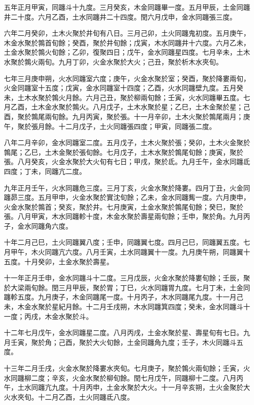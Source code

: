 \begin{pinyinscope}
五年正月甲寅，同躔斗十九度。三月癸亥，木金同躔畢一度。五月甲辰，土金同躔井二十度。六月乙酉，土水同躔井二十四度。閏六月戊申，金水同躔張三度。

六年二月癸卯，土木火聚於井旬有八日。三月己卯，土火同躔鬼初度。五月庚午，木金水聚於鶉首旬餘；癸酉，聚於井旬餘；戊寅，木水同躔井十六度。六月乙未，土金水聚於鶉火旬餘；乙卯，復聚四日；戊午，金水同躔星四度。七月辛未，土木水聚於鶉火兩旬。九月丁卯，火金水聚於大火；己丑，聚於析木水夾旬。

七年三月庚申朔，火水同躔室六度；庚午，火金水聚於室；癸酉，聚於降婁兩旬，火金同躔室十五度；戊寅，金水同躔室十四度；乙酉，火水同躔壁九度。五月癸未，土木水聚於鶉火月餘。六月己丑，聚於柳兩旬餘；壬寅，火水同躔畢五度。七月乙酉，土木金水聚於鶉火。八月戊子，土木水聚於星；乙巳，土木金聚於星；己酉，聚於鶉尾兩旬餘。九月丙寅，聚於張。十一月辛卯，土木火聚於鶉尾兩月；庚午，聚於張月餘。十二月戊子，土火同躔張四度；甲寅，同躔張二度。

八年二月辛卯，金水同躔室二度。五月戊子，土木火聚於張；癸卯，土木火金聚於鶉尾；乙巳，土木金聚於張旬餘。七月戊子，土木水聚於鶉尾旬餘；庚寅，聚於張。八月癸亥，火金水聚於大火旬有七日；甲戌，聚於氐。九月壬午，金水同躔氐四度；丁未，同躔亢二度。

九年正月壬午，火水同躔危三度。三月丁亥，火金水聚於降婁。四月丁丑，火金同躔昴三度。五月甲申，火金水聚於實沈旬餘；乙未，金水同躔觜一度。六月庚申，火金水聚於鶉首；癸亥，聚於井。七月庚寅，土金水聚於鶉尾旬餘；癸巳，聚於張。八月甲寅，木水同躔軫十度，木金水聚於壽星兩旬餘；壬申，聚於角。九月丙子，金水同躔角六度。

十年二月己巳，土火同躔翼八度；壬申，同躔翼七度。四月己巳，同躔翼五度。七月甲午，木火同躔亢六度。八月壬寅，土水同躔翼十一度。九月庚午朔，同躔翼十五度。十月癸卯，土金水聚於壽星。

十一年正月壬申，金水同躔斗十二度。三月戊辰，火金水聚於降婁旬餘；壬辰，聚於大梁兩旬餘。閏三月甲辰，聚於胃；丁巳，火水同躔胃九度。七月丁未，土金同躔軫五度。九月庚子，木金同躔尾一度。十月丙子，木水同躔尾九度。十一月己未，木金水聚於星紀月餘。十二月壬戌朔，木水同躔箕四度；癸未，金水同躔斗十一度；丙戌，木金水聚於斗。

十二年七月戊午，金水同躔星二度。八月丙戌，土金水聚於星、壽星旬有七日。九月壬寅，聚於角；己酉，聚於大火旬餘，土金同躔角九度；壬子，木火同躔斗五度。

十三年二月壬戌，火金水聚於降婁水夾旬。七月庚子，聚於鶉火兩旬餘；壬寅，火水同躔柳二度；辛亥，火金水聚於柳旬餘。閏七月戊午，同躔柳十二度。八月丙午，土水同躔亢九度。十月丙申，土金水聚於大火。十一月辛亥朔，土火金聚於大火水夾旬。十二月乙酉，土火同躔氐八度。


\end{pinyinscope}
